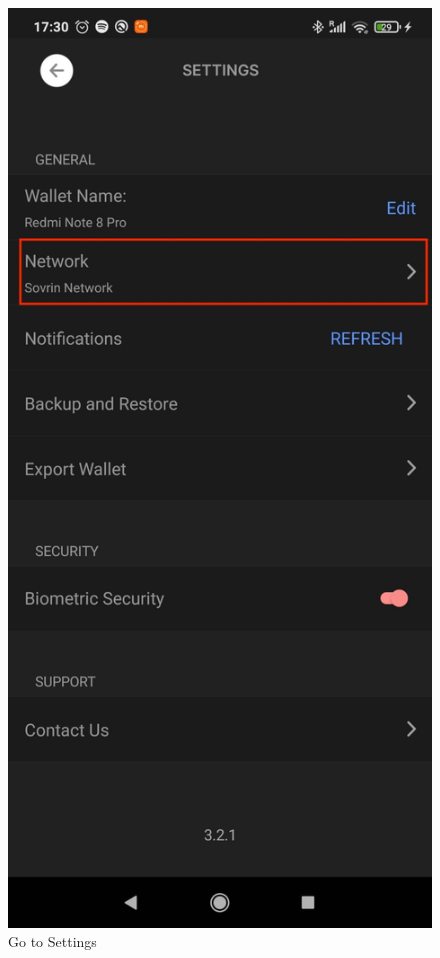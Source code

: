 \begin{figure}[!htb]
  \caption[]{Go to Settings}\label{fig:trinsic_1}
\endminipage\hfill
{}
  \includegraphics[width=\linewidth]{images/Trinsic/Trinsic_setup_network1.jpeg}

\end{figure}
